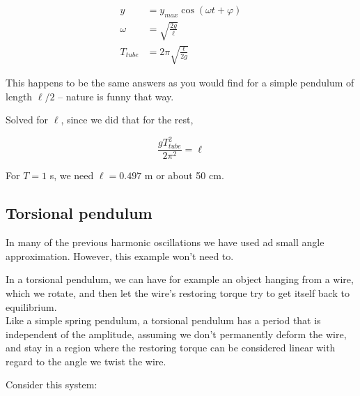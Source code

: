 \begin{align}
y &= y_{max} \cos(\omega t + \varphi)\\
\omega &= \sqrt{\frac{2 g}{\ell}}\\
T_{tube} &= 2 \pi \sqrt{\frac{\ell}{2 g}}
\end{align}

This happens to be the same answers as you would find for a simple pendulum of length $\ell/2$ -- nature is funny that way.

Solved for $\ell$, since we did that for the rest,

\begin{equation}
\frac{g T_{tube}^2}{2 \pi^2} = \ell
\end{equation}

For $T = 1$ s, we need $\ell = 0.497$ m or about 50 cm.

\subsection{Torsional pendulum}

In many of the previous harmonic oscillations we have used ad small angle approximation. However, this example won't need to.

In a torsional pendulum, we can have for example an object hanging from a wire, which we rotate, and then let the wire's restoring torque try to get itself back to equilibrium.\\
Like a simple spring pendulum, a torsional pendulum has a period that is independent of the amplitude, assuming we don't permanently deform the wire, and stay in a region where the restoring torque can be considered linear with regard to the angle we twist the wire.

Consider this system:

\begin{figure}[H]
\centering
{}
\end{figure}


